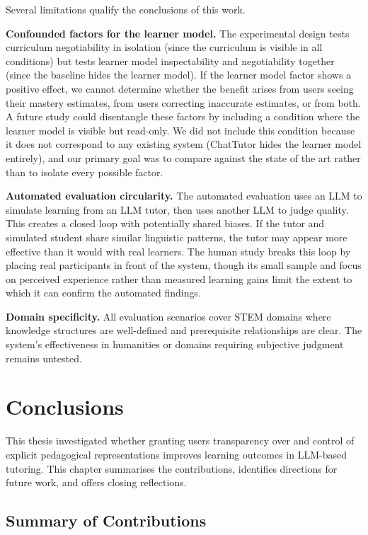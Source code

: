 \documentclass[logo,bsc,singlespacing,parskip,online]{infthesis}
\begin{document}
Several limitations qualify the conclusions of this work.

\textbf{Confounded factors for the learner model.} The experimental design tests curriculum negotiability in isolation (since the curriculum is visible in all conditions) but tests learner model inspectability and negotiability together (since the baseline hides the learner model). If the learner model factor shows a positive effect, we cannot determine whether the benefit arises from users seeing their mastery estimates, from users correcting inaccurate estimates, or from both. A future study could disentangle these factors by including a condition where the learner model is visible but read-only. We did not include this condition because it does not correspond to any existing system (ChatTutor hides the learner model entirely), and our primary goal was to compare against the state of the art rather than to isolate every possible factor.

\textbf{Automated evaluation circularity.} The automated evaluation uses an LLM to simulate learning from an LLM tutor, then uses another LLM to judge quality. This creates a closed loop with potentially shared biases. If the tutor and simulated student share similar linguistic patterns, the tutor may appear more effective than it would with real learners. The human study breaks this loop by placing real participants in front of the system, though its small sample and focus on perceived experience rather than measured learning gains limit the extent to which it can confirm the automated findings.

\textbf{Domain specificity.} All evaluation scenarios cover STEM domains where knowledge structures are well-defined and prerequisite relationships are clear. The system's effectiveness in humanities or domains requiring subjective judgment remains untested.

\chapter{Conclusions}

This thesis investigated whether granting users transparency over and control of explicit pedagogical representations improves learning outcomes in LLM-based tutoring. This chapter summarises the contributions, identifies directions for future work, and offers closing reflections.

\section{Summary of Contributions}
\end{document}
